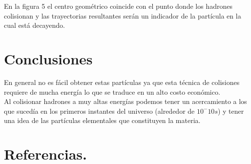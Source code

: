 \documentclass[%
 reprint,
 amsmath,amssymb,
 aps,
]{revtex4-2}
\begin{document}
En la figura 5 el centro geométrico coincide con el punto donde los hadrones colisionan y las trayectorias resultantes serán un indicador de la partícula en la cual está decayendo.

\section{\label{sec:level1}Conclusiones}

En general no es fácil obtener estas partículas ya que esta técnica de colisiones requiere de mucha energía lo que se traduce en un alto costo económico.\\

Al colisionar hadrones a muy altas energías podemos tener un acercamiento a los que sucedía en los primeros instantes del universo (alrededor de $10^-{10} s$) y tener una idea de las partículas elementales que constituyen la materia.

\section{\label{sec:level1} Referencias.}
\end{document}
